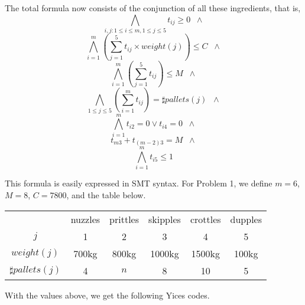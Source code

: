 \documentclass[11pt]{article}
\begin{document}
The total formula now consists of the conjunction of all these
ingredients, that is,
\[ \bigwedge_{i,j:1 \leq i \leq m, 1 \leq j \leq 5} t_{ij} \geq 0 \;\; \wedge \]
\[ \bigwedge_{i=1}^m  (\sum_{j=1}^5 t_{ij} \times weight(j)) \leq C \;\; \wedge \]
\[ \bigwedge_{i=1}^m (\sum_{j=1}^5 t_{ij}) \leq M \;\; \wedge \]
\[ \bigwedge_{1\leq j \leq5} (\sum_{i=1}^m t_{ij}) = \sharp pallets(j) \;\; \wedge \]
\[ \bigwedge_{i=1}^m t_{i2}=0 \vee t_{i4}=0 \;\; \wedge \]
\[ t_{m3} + t_{(m-2)3} = M \;\; \wedge \]
\[ \bigwedge_{i=1}^m t_{i5} \leq 1 \]

This formula is easily expressed in SMT syntax. For Problem 1, we define $m = 6$, $M = 8$, $C = 7800$, and the table below.
\begin{center}
\begin{tabular}{|c|c|c|c|c|c|}
  \hline
    & nuzzles & prittles & skipples & crottles & dupples \\
  $j$ & 1 & 2 & 3 & 4 & 5 \\
  $weight(j)$ & 700kg & 800kg & 1000kg & 1500kg & 100kg \\
  $\sharp pallets(j)$ & 4 & $n$ & 8 & 10 & 5 \\
  \hline
\end{tabular}
\end{center}

With the values above, we get the following Yices codes.
\end{document}
